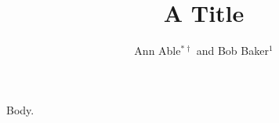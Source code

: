 \documentclass{revtex4-2}
\begin{document}
\title{A Title}
\author{Ann Able$^{*\dagger}$ and Bob Baker$^{1}$}
\maketitle
Body.
\end{document}
